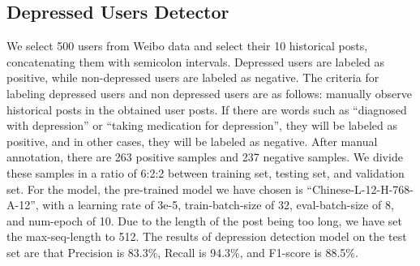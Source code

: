 \subsection{Depressed Users Detector}
\label{apd:dd_details}
We select 500 users from Weibo data and select their 10 historical posts, concatenating them with semicolon intervals. Depressed users are labeled as positive, while non-depressed users are labeled as negative. The criteria for labeling depressed users and non depressed users are as follows: manually observe historical posts in the obtained user posts. If there are words such as ``diagnosed with depression'' or ``taking medication for depression'', they will be labeled as positive, and in other cases, they will be labeled as negative.
After manual annotation, there are 263 positive samples and 237 negative samples.
We divide these samples in a ratio of 6:2:2 between training set, testing set, and validation set. For the model, the pre-trained model we have chosen is ``Chinese-L-12-H-768-A-12'', with a learning rate of 3e-5, train-batch-size of 32, eval-batch-size of 8, and num-epoch of 10. Due to the length of the post being too long, we have set the max-seq-length to 512. The results of depression detection model on the test set are that Precision is 83.3\%, Recall is 94.3\%, and F1-score is 88.5\%.

